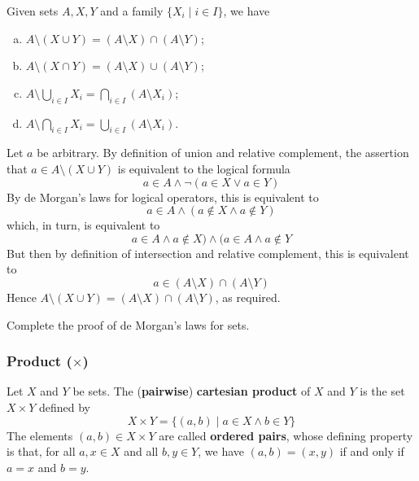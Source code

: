 \begin{theorem}
\label{thmDeMorganForSets}
Given sets $A,X,Y$ and a family $\{ X_i \mid i \in I \}$, we have
\begin{enumerate}[(a)] 
\item $A \setminus (X \cup Y) = (A \setminus X) \cap (A \setminus Y)$;
\item $A \setminus (X \cap Y) = (A \setminus X) \cup (A \setminus Y)$;
\item $\displaystyle A \setminus \bigcup_{i \in I} X_i = \bigcap_{i \in I} (A \setminus X_i)$;
\item $\displaystyle A \setminus \bigcap_{i \in I} X_i = \bigcup_{i \in I} (A \setminus X_i)$.
\end{enumerate}
\end{theorem}

\begin{cproof}[of (a)]
Let $a$ be arbitrary. By definition of union and relative complement, the assertion that $a \in A \setminus (X \cup Y)$ is equivalent to the logical formula
\[ a \in A \wedge \neg (a \in X \vee a \in Y) \]
By de Morgan's laws for logical operators, this is equivalent to
\[ a \in A \wedge (a \not\in X \wedge a \not\in Y) \]
which, in turn, is equivalent to
\[ a \in A \wedge a \not\in X) \wedge (a \in A \wedge a \not\in Y \]
But then by definition of intersection and relative complement, this is equivalent to
\[ a \in (A \setminus X) \cap (A \setminus Y) \]
Hence $A \setminus (X \cup Y) = (A \setminus X) \cap (A \setminus Y)$, as required.
\end{cproof}

\begin{exercise}
Complete the proof of de Morgan's laws for sets.
\end{exercise}

\subsubsection*{Product ($\times$)}

\begin{definition}
\label{defCartesianProductPairwise}
Let $X$ and $Y$ be sets. The (\textbf{pairwise}) \textbf{cartesian product} of $X$ and $Y$ is the set $X \times Y$  defined by
\[ X \times Y = \{ (a,b) \mid a \in X \wedge b \in Y \} \]
The elements $(a,b) \in X \times Y$ are called \textbf{ordered pairs}, whose defining property is that, for all $a,x \in X$ and all $b,y \in Y$, we have $(a,b) = (x,y)$ if and only if $a=x$ and $b=y$.
\end{definition}

